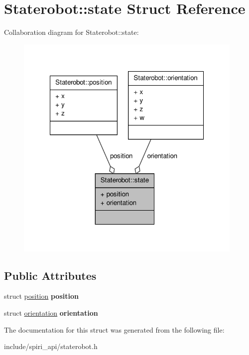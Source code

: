 \hypertarget{struct_staterobot_1_1state}{\section{\-Staterobot\-:\-:state \-Struct \-Reference}
\label{struct_staterobot_1_1state}
}


\-Collaboration diagram for \-Staterobot\-:\-:state\-:
\nopagebreak
\begin{figure}[H]
\begin{center}
\leavevmode
\includegraphics[width=310pt]{struct_staterobot_1_1state__coll__graph}
\end{center}
\end{figure}
\subsection*{\-Public \-Attributes}
\begin{DoxyCompactItemize}
\item 
\hypertarget{struct_staterobot_1_1state_a1b3ab38c820d2a1c70c15d7a52e8e651}{struct \hyperlink{struct_staterobot_1_1position}{position} {\bfseries position}}\label{struct_staterobot_1_1state_a1b3ab38c820d2a1c70c15d7a52e8e651}

\item 
\hypertarget{struct_staterobot_1_1state_a8fee75dc89f771461844a6d39641d163}{struct \hyperlink{struct_staterobot_1_1orientation}{orientation} {\bfseries orientation}}\label{struct_staterobot_1_1state_a8fee75dc89f771461844a6d39641d163}

\end{DoxyCompactItemize}


\-The documentation for this struct was generated from the following file\-:\begin{DoxyCompactItemize}
\item 
include/spiri\-\_\-api/staterobot.\-h\end{DoxyCompactItemize}
